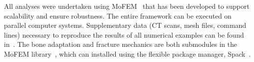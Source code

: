 \documentclass[review]{elsarticle}
\numberwithin{equation}{section}
\begin{document}
All analyses were undertaken using MoFEM~\citep{mofem2017} that has been developed to support scalability and ensure robustness. The entire framework can be executed on parallel computer systems. Supplementary data (CT scans, mesh files, command lines) necessary to reproduce the results of all numerical examples can be found in~\citep{karol_lewandowski_2019_dataset}. The bone adaptation and fracture mechanics are both submodules in the MoFEM library~\citep{mofem2017}, which can installed using the flexible package manager, Spack~\citep{spack2015}. 



\newpage
% 





\end{document}
